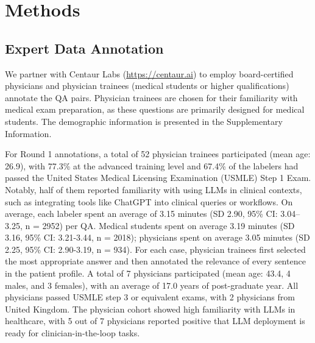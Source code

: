 \documentclass[fleqn,10pt]{wlscirep}
\begin{document}
\section{Methods}


\subsection{Expert Data Annotation}

We partner with Centaur Labs (\url{https://centaur.ai}) to employ board-certified physicians and physician trainees (medical students or higher qualifications) annotate the QA pairs. Physician trainees are chosen for their familiarity with medical exam preparation, as these questions are primarily designed for medical students. The demographic information is presented in the Supplementary Information.

For Round 1 annotations, a total of 52 physician trainees participated (mean age: 26.9), with 77.3\% at the advanced training level and 67.4\% of the labelers had passed the United States Medical Licensing Examination (USMLE) Step 1 Exam. Notably, half of them reported familiarity with using LLMs in clinical contexts, such as integrating tools like ChatGPT into clinical queries or workflows. On average, each labeler spent an average of 3.15 minutes (SD 2.90, 95\% CI: 3.04–3.25, n = 2952) per QA. Medical students spent on average 3.19 minutes (SD 3.16, 95\% CI: 3.21-3.44, n = 2018); physicians spent on average 3.05 minutes (SD 2.25, 95\% CI: 2.90-3.19, n = 934). For each case, physician trainees first selected the most appropriate answer and then annotated the relevance of every sentence in the patient profile. A total of 7 physicians participated (mean age: 43.4, 4 males, and 3 females), with an average of 17.0 years of post-graduate year. All physicians passed USMLE step 3 or equivalent exams, with 2 physicians from United Kingdom. The physician cohort showed high familiarity with LLMs in healthcare, with 5 out of 7 physicians reported positive that LLM deployment is ready for clinician-in-the-loop tasks. 
\end{document}
